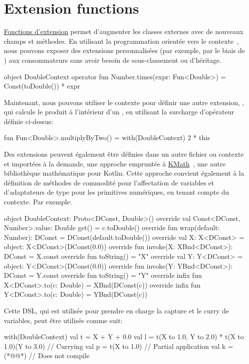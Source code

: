 \section{Extension functions}\label{sec:extension-functions}

\href{https://kotlinlang.org/docs/reference/extensions.html}{Fonctions d'extension} permet d'augmenter les classes externes avec de nouveaux champs et méthodes. En utilisant la programmation orientée vers le contexte~\citep{hirschfeld2008context}, nous pouvons exposer des extensions personnalisées (par exemple, par le biais de ) aux consommateurs sans avoir besoin de sous-classement ou d'héritage.
%
\begin{kotlinlisting}[caption={We can provide numerical extensions, wrapped in a context.}]
object DoubleContext {
    operator fun Number.times(expr: Fun<Double>) = Const(toDouble()) * expr
}
\end{kotlinlisting}
%
Maintenant, nous pouvons utiliser le contexte pour définir une autre extension, , qui calcule le produit à l'intérieur d'un , en utilisant la surcharge d'opérateur définie ci-dessus:
%
\begin{kotlinlisting}
fun Fun<Double>.multiplyByTwo() = with(DoubleContext) { 2 * this }
\end{kotlinlisting}
%
Des extensions peuvent également être définies dans un autre fichier ou contexte et importées à la demande, une approche empruntée à \href{https://github.com/mipt-npm/kmath}{KMath}~\citep{nozik2019kmath}, une autre bibliothèque mathématique pour Kotlin. Cette approche convient également à la définition de méthodes de commodité pour l'affectation de variables et d'adaptateurs de type pour les primitives numériques, en tenant compte du contexte. Par exemple:
%
\begin{kotlinlisting}
object DoubleContext: Proto<DConst, Double>() {
    override val Const<DConst, Number>.value: Double
    get() = c.toDouble()
    override fun wrap(default: Number): DConst = DConst(default.toDouble())
    override val X: X<DConst> = object: X<DConst>(DConst(0.0)) {
        override fun invoke(X: XBnd<DConst>): DConst = X.const
        override fun toString() = "X"
    }
    override val Y: Y<DConst> = object: Y<DConst>(DConst(0.0)) {
        override fun invoke(Y: YBnd<DConst>): DConst = Y.const
        override fun toString() = "Y"
    }
    override infix fun X<DConst>.to(c: Double) = XBnd(DConst(c))
    override infix fun Y<DConst>.to(c: Double) = YBnd(DConst(c))
}
\end{kotlinlisting}
%
Cette DSL, qui est utilisée pour prendre en charge la capture et le curry de variables, peut être utilisée comme suit:
%
\begin{kotlinlisting}
with(DoubleContext) {
    val t = X + Y + 0.0
    val l = t(X to 1.0, Y to 2.0) * t(X to 1.0)(Y to 3.0) // Currying
    val p = t(X to 1.0) // Partial application
    val k = (*@@*) // Does not compile
}
\end{kotlinlisting}


